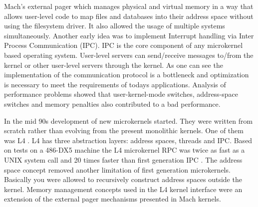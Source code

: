 \documentclass{acm_proc_article-sp}
\begin{document}
Mach's external pager \cite{p70liedtke} which manages physical and virtual memory in a way that allows
user-level code to map files and databases into their address space without using the filesystem
driver.
It also allowed the usage of multiple systems simultaneously.
Another early idea was to implement Interrupt handling via Inter Process Communication (IPC).
IPC is the core component of any microkernel based operating system.
User-level servers can send/receive messages to/from the kernel or other user-level servers
through the kernel.
As one can see the implementation of the communication protocol is a bottleneck and optimization
is necessary to meet the requirements of todays applications.
Analysis of performance problems \cite{p70liedtke} showed that user-kernel-mode switches, address-space
switches and memory penalties also contributed to a bad performance.

In the mid 90s development of new microkernels started.
They were written from scratch rather than evolving from the present monolithic kernels.
One of them was L4 \cite{l4}.
L4 has three abstraction layers: address spaces, threads and IPC.
Based on tests on a 486-DX5 machine the L4 microkernel RPC was twice as fast as a UNIX system call
and 20 times faster than first generation IPC \cite{p70liedtke}.
The address space concept removed another limitation of first generation microkernels.
Basically you were allowed to recursively construct address spaces outside the kernel.
Memory management concepts used in the L4 kernel interface were an extension of the external
pager mechanisms presented in Mach kernels.
\end{document}
